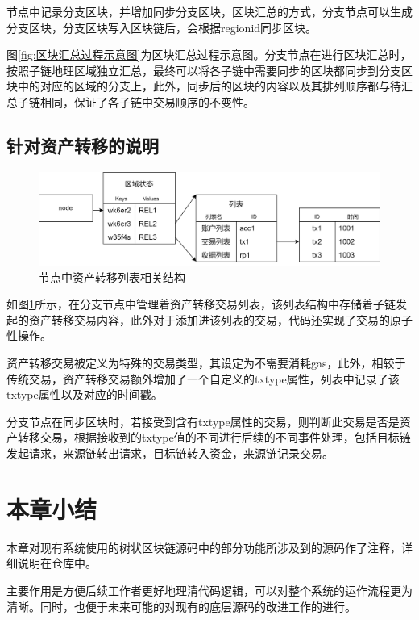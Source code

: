 节点中记录分支区块，并增加同步分支区块，区块汇总的方式，分支节点可以生成分支区块，分支区块写入区块链后，会根据regionid同步区块。

图\ref{fig:区块汇总过程示意图}为区块汇总过程示意图。分支节点在进行区块汇总时，按照子链地理区域独立汇总，最终可以将各子链中需要同步的区块都同步到分支区块中的对应的区域的分支上，此外，同步后的区块的内容以及其排列顺序都与待汇总子链相同，保证了各子链中交易顺序的不变性。

\subsection{针对资产转移的说明}

\begin{figure}
	\centering
	\includegraphics[width=\textwidth]{figures/交易列表.png}
	\caption{节点中资产转移列表相关结构}
	\label{fig:节点中资产转移列表相关结构}
\end{figure}

如图\ref{fig:节点中资产转移列表相关结构}所示，在分支节点中管理着资产转移交易列表，该列表结构中存储着子链发起的资产转移交易内容，此外对于添加进该列表的交易，代码还实现了交易的原子性操作。

资产转移交易被定义为特殊的交易类型，其设定为不需要消耗gas，此外，相较于传统交易，资产转移交易额外增加了一个自定义的txtype属性，列表中记录了该txtype属性以及对应的时间戳。

分支节点在同步区块时，若接受到含有txtype属性的交易，则判断此交易是否是资产转移交易，根据接收到的txtype值的不同进行后续的不同事件处理，包括目标链发起请求，来源链转出请求，目标链转入资金，来源链记录交易。

\section{本章小结}

本章对现有系统使用的树状区块链源码中的部分功能所涉及到的源码作了注释，详细说明在仓库中。

主要作用是方便后续工作者更好地理清代码逻辑，可以对整个系统的运作流程更为清晰。同时，也便于未来可能的对现有的底层源码的改进工作的进行。
